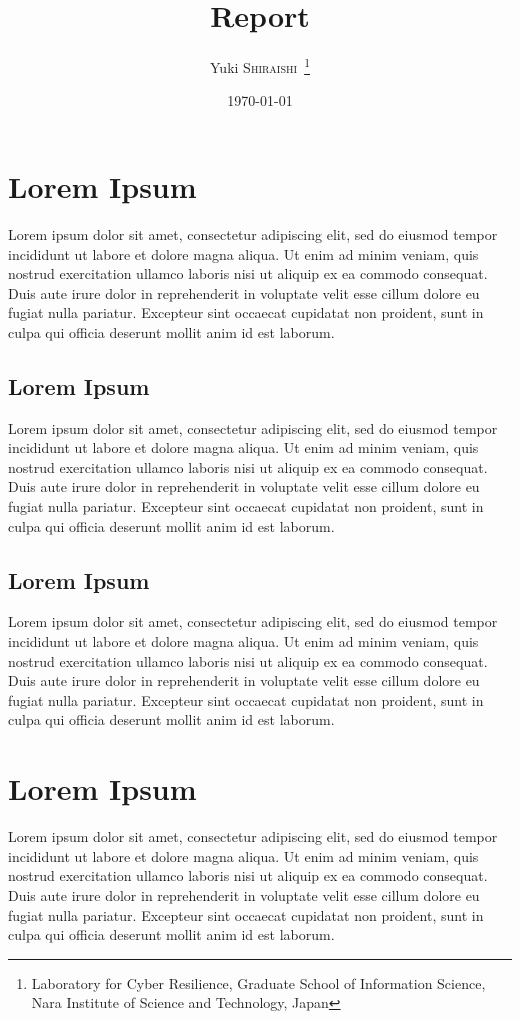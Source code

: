 \documentclass[
  uplatex,
  dvipdfmx,
  a4paper,
  english,
  twocolumn,
  10pt
]{jsarticle}
\title{
  \textbf{Report}
}
\author{
  Yuki \textsc{Shiraishi}~\thanks{Laboratory for Cyber Resilience, Graduate School of Information Science, Nara Institute of Science and Technology, Japan}
}
\date{\today}
\begin{document}
\maketitle

\section{Lorem Ipsum}
Lorem ipsum dolor sit amet, consectetur adipiscing elit, sed do eiusmod tempor incididunt ut labore et dolore magna aliqua.
Ut enim ad minim veniam, quis nostrud exercitation ullamco laboris nisi ut aliquip ex ea commodo consequat.
Duis aute irure dolor in reprehenderit in voluptate velit esse cillum dolore eu fugiat nulla pariatur.
Excepteur sint occaecat cupidatat non proident, sunt in culpa qui officia deserunt mollit anim id est laborum.

\subsection{Lorem Ipsum}
Lorem ipsum dolor sit amet, consectetur adipiscing elit, sed do eiusmod tempor incididunt ut labore et dolore magna aliqua.
Ut enim ad minim veniam, quis nostrud exercitation ullamco laboris nisi ut aliquip ex ea commodo consequat.
Duis aute irure dolor in reprehenderit in voluptate velit esse cillum dolore eu fugiat nulla pariatur.
Excepteur sint occaecat cupidatat non proident, sunt in culpa qui officia deserunt mollit anim id est laborum.

\subsection{Lorem Ipsum}
Lorem ipsum dolor sit amet, consectetur adipiscing elit, sed do eiusmod tempor incididunt ut labore et dolore magna aliqua.
Ut enim ad minim veniam, quis nostrud exercitation ullamco laboris nisi ut aliquip ex ea commodo consequat.
Duis aute irure dolor in reprehenderit in voluptate velit esse cillum dolore eu fugiat nulla pariatur.
Excepteur sint occaecat cupidatat non proident, sunt in culpa qui officia deserunt mollit anim id est laborum.

\section{Lorem Ipsum}
Lorem ipsum dolor sit amet, consectetur adipiscing elit, sed do eiusmod tempor incididunt ut labore et dolore magna aliqua.
Ut enim ad minim veniam, quis nostrud exercitation ullamco laboris nisi ut aliquip ex ea commodo consequat.
Duis aute irure dolor in reprehenderit in voluptate velit esse cillum dolore eu fugiat nulla pariatur.
Excepteur sint occaecat cupidatat non proident, sunt in culpa qui officia deserunt mollit anim id est laborum.
\end{document}
